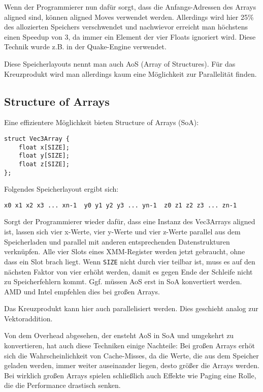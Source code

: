 \documentclass[a4paper,10pt]{article}
\begin{document}
Wenn der Programmierer nun dafür sorgt, dass die Anfangs-Adressen des Arrays aligned sind, können
aligned Moves verwendet werden. Allerdings wird hier 25\% des allozierten Speichers verschwendet und
nachwievor erreicht man höchstens einen Speedup von 3, da immer ein Element der vier Floats
ignoriert wird. Diese Technik wurde z.B. in der Quake-Engine verwendet.

Diese Speicherlayouts nennt man auch AoS (Array of Structures). Für das Kreuzprodukt wird man allerdings
kaum eine Möglichkeit zur Parallelität finden.

\subsection{Structure of Arrays}

Eine effizientere Möglichkeit bieten Structure of Arrays (SoA):

\begin{verbatim}
struct Vec3Array {
    float x[SIZE];
    float y[SIZE];
    float z[SIZE];
};
\end{verbatim}

Folgendes Speicherlayout ergibt sich:

\begin{verbatim}
x0 x1 x2 x3 ... xn-1  y0 y1 y2 y3 ... yn-1  z0 z1 z2 z3 ... zn-1
\end{verbatim}

Sorgt der Programmierer wieder dafür, dass eine Instanz des Vec3Arrays aligned ist, lassen sich vier
x-Werte, vier y-Werte und vier z-Werte parallel aus dem Speicherladen und parallel mit anderen
entsprechenden Datenstrukturen verknüpfen. Alle vier Slots eines XMM-Register werden jetzt
gebraucht, ohne dass ein Slot brach liegt. Wenn \texttt{SIZE} nicht durch vier teilbar ist, muss es
auf den nächsten Faktor von vier erhöht werden, damit es gegen Ende der Schleife nicht zu
Speicherfehlern kommt. Ggf. müssen AoS erst in SoA konvertiert werden. AMD und Intel empfehlen dies
bei großen Arrays. 

Das Kreuzprodukt kann hier auch parallelisiert werden. Dies geschieht analog zur Vektoraddition.

Von dem Overhead abgesehen, der ensteht AoS in SoA und umgekehrt zu konvertieren, hat auch diese
Techniken einige Nachteile: Bei großen Arrays erhöt sich die Wahrscheinlichkeit von Cache-Misses, da
die Werte, die aus dem Speicher geladen werden, immer weiter auseinander liegen, desto größer die
Arrays werden. Bei wirklich großen Arrays spielen schließlich auch Effekte wie Paging eine Rolle,
die die Performance drastisch senken.
\end{document}

